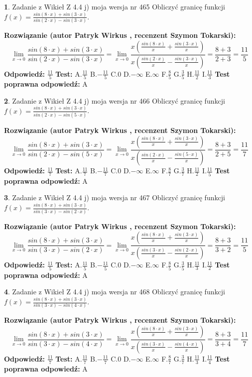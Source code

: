 \documentclass[12pt, a4paper]{article}
\theoremstyle{definition} %
\newtheorem{zad}{}
\newcommand{\zadStart}[1]{\begin{zad}#1\newline}
\newcommand{\zadStop}{\end{zad}}
\newcommand{\rozwStart}[2]{\noindent \textbf{Rozwiązanie (autor #1 , recenzent #2): }\newline}
\newcommand{\rozwStop}{\newline}
\newcommand{\odpStart}{\noindent \textbf{Odpowiedź:}\newline}
\newcommand{\odpStop}{\newline}
\newcommand{\testStart}{\noindent \textbf{Test:}\newline}
\newcommand{\testStop}{\newline}
\newcommand{\kluczStart}{\noindent \textbf{Test poprawna odpowiedź:}\newline}
\newcommand{\kluczStop}{\newline}
\begin{document}
\zadStart{Zadanie z Wikieł Z 4.4 j) moja wersja nr 465}
Obliczyć granicę funkcji $f(x)=\frac{sin(8\cdot x) +sin(3\cdot x)}{sin(2\cdot x) -sin(3\cdot x)}$.
\zadStop
\rozwStart{Patryk Wirkus}{Szymon Tokarski}
$$\lim\limits_{x\to 0}\frac{sin(8\cdot x) +sin(3\cdot x)}{sin(2\cdot x) -sin(3\cdot x)}=\lim\limits_{x\to 0}\frac{x(\frac{sin(8\cdot x)}{x}+\frac{sin(3\cdot x)}{x})}{x(\frac{sin(2\cdot x)}{x}-\frac{sin(3\cdot x)}{x})}=\frac{8+3}{2+3} = \frac{11}{5}$$
\rozwStop
\odpStart
$\frac{11}{5}$
\odpStop
\testStart
A.$\frac{11}{5}$
B.$-\frac{11}{5}$
C.$0$
D.$-\infty$
E.$\infty$
F.$\frac{8}{5}$
G.$\frac{3}{5}$
H.$\frac{11}{2}$
I.$\frac{11}{3}$
\testStop
\kluczStart
A
\kluczStop



\zadStart{Zadanie z Wikieł Z 4.4 j) moja wersja nr 466}
Obliczyć granicę funkcji $f(x)=\frac{sin(8\cdot x) +sin(3\cdot x)}{sin(2\cdot x) -sin(5\cdot x)}$.
\zadStop
\rozwStart{Patryk Wirkus}{Szymon Tokarski}
$$\lim\limits_{x\to 0}\frac{sin(8\cdot x) +sin(3\cdot x)}{sin(2\cdot x) -sin(5\cdot x)}=\lim\limits_{x\to 0}\frac{x(\frac{sin(8\cdot x)}{x}+\frac{sin(3\cdot x)}{x})}{x(\frac{sin(2\cdot x)}{x}-\frac{sin(5\cdot x)}{x})}=\frac{8+3}{2+5} = \frac{11}{7}$$
\rozwStop
\odpStart
$\frac{11}{7}$
\odpStop
\testStart
A.$\frac{11}{7}$
B.$-\frac{11}{7}$
C.$0$
D.$-\infty$
E.$\infty$
F.$\frac{8}{7}$
G.$\frac{3}{7}$
H.$\frac{11}{2}$
I.$\frac{11}{5}$
\testStop
\kluczStart
A
\kluczStop



\zadStart{Zadanie z Wikieł Z 4.4 j) moja wersja nr 467}
Obliczyć granicę funkcji $f(x)=\frac{sin(8\cdot x) +sin(3\cdot x)}{sin(3\cdot x) -sin(2\cdot x)}$.
\zadStop
\rozwStart{Patryk Wirkus}{Szymon Tokarski}
$$\lim\limits_{x\to 0}\frac{sin(8\cdot x) +sin(3\cdot x)}{sin(3\cdot x) -sin(2\cdot x)}=\lim\limits_{x\to 0}\frac{x(\frac{sin(8\cdot x)}{x}+\frac{sin(3\cdot x)}{x})}{x(\frac{sin(3\cdot x)}{x}-\frac{sin(2\cdot x)}{x})}=\frac{8+3}{3+2} = \frac{11}{5}$$
\rozwStop
\odpStart
$\frac{11}{5}$
\odpStop
\testStart
A.$\frac{11}{5}$
B.$-\frac{11}{5}$
C.$0$
D.$-\infty$
E.$\infty$
F.$\frac{8}{5}$
G.$\frac{3}{5}$
H.$\frac{11}{3}$
I.$\frac{11}{2}$
\testStop
\kluczStart
A
\kluczStop



\zadStart{Zadanie z Wikieł Z 4.4 j) moja wersja nr 468}
Obliczyć granicę funkcji $f(x)=\frac{sin(8\cdot x) +sin(3\cdot x)}{sin(3\cdot x) -sin(4\cdot x)}$.
\zadStop
\rozwStart{Patryk Wirkus}{Szymon Tokarski}
$$\lim\limits_{x\to 0}\frac{sin(8\cdot x) +sin(3\cdot x)}{sin(3\cdot x) -sin(4\cdot x)}=\lim\limits_{x\to 0}\frac{x(\frac{sin(8\cdot x)}{x}+\frac{sin(3\cdot x)}{x})}{x(\frac{sin(3\cdot x)}{x}-\frac{sin(4\cdot x)}{x})}=\frac{8+3}{3+4} = \frac{11}{7}$$
\rozwStop
\odpStart
$\frac{11}{7}$
\odpStop
\testStart
A.$\frac{11}{7}$
B.$-\frac{11}{7}$
C.$0$
D.$-\infty$
E.$\infty$
F.$\frac{8}{7}$
G.$\frac{3}{7}$
H.$\frac{11}{3}$
I.$\frac{11}{4}$
\testStop
\kluczStart
A
\kluczStop
\end{document}

